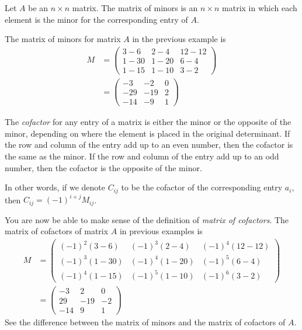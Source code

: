 \documentclass{subfile}
\begin{document}
	\begin{definition}
		Let $A$ be an $n\times n$ matrix. The matrix of minors is an $n\times n$ matrix in which each element is the minor for the corresponding entry of $A$.
	\end{definition}

	\begin{example}
		The matrix of minors for matrix $A$ in the previous example is
		\begin{align*}
			M
				& =
					\begin{pmatrix}
						3-6&2-4&12-12\\1-30&1-20&6-4\\1-15&1-10&3-2
					\end{pmatrix}\\
				& =
					\begin{pmatrix}
						-3&-2&0\\-29&-19&2\\-14&-9&1
					\end{pmatrix}
		\end{align*}
	\end{example}

	\begin{definition}[Cofactor]
		The \textit{cofactor} for any entry of a matrix is either the minor or the opposite of the minor, depending on where the element is placed in the original determinant. If the row and column of the entry add up to an even number, then the cofactor is the same as the minor. If the row and column of the entry add up to an odd number, then the cofactor is the opposite of the minor.

		In other words, if we denote $C_{ij}$ to be the cofactor of the corresponding entry $a_{i}$, then $C_{ij}=(-1)^{i+j} M_{ij}$.
	\end{definition}

	\begin{example}
		You are now be able to make sense of the definition of \textit{matrix of cofactors}. The matrix of cofactors of matrix $A$ in previous examples is
			\begin{align*}
				M
					& =
					\begin{pmatrix}
						(-1)^{2}(3-6)&(-1)^{3}(2-4)&(-1)^{4}(12-12)\\ 	(-1)^{3}(1-30)&(-1)^{4}(1-20)&(-1)^{5}(6-4)\\ (-1)^{4}(1-15)&(-1)^{5}(1-10)&(-1)^{6}(3-2)
					\end{pmatrix}\\
					& =
					\begin{pmatrix}
						-3&2&0\\29&-19&-2\\-14&9&1
					\end{pmatrix}
			\end{align*}
		See the difference between the matrix of minors and the matrix of cofactors of $A$.
	\end{example}
\end{document}
